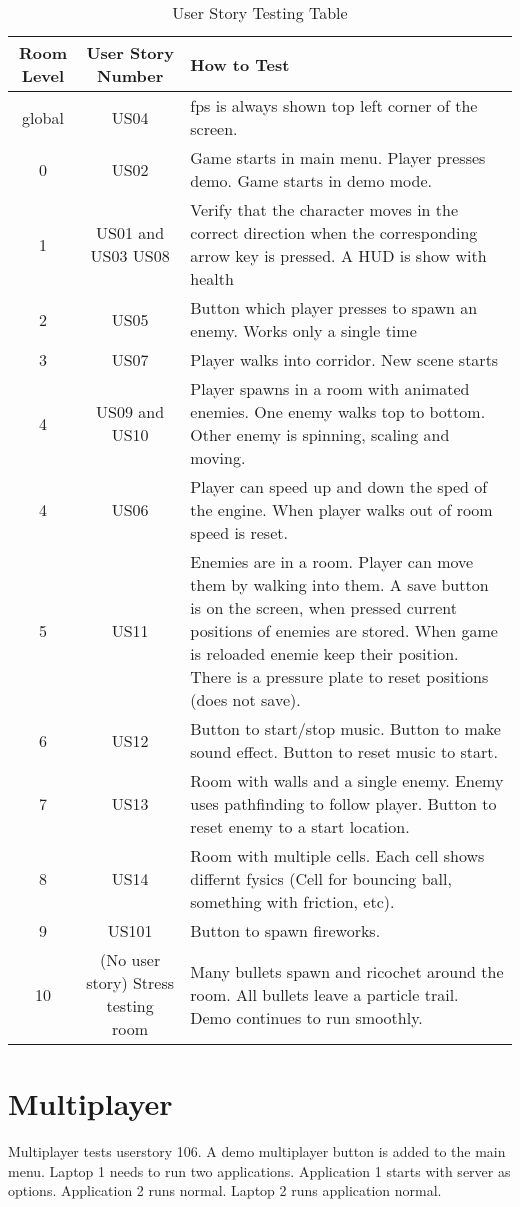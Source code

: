 \documentclass{article}
\begin{document}
\begin{table}[h!]
\centering
\begin{tabular}{|c|c|p{8cm}|}
\hline
\textbf{Room Level} & \textbf{User Story Number} & \textbf{How to Test} \\
\hline
global & US04 & fps is always shown top left corner of the screen. \\
\hline
0 & US02 & Game starts in main menu. Player presses demo. Game starts in demo mode. \\
\hline
1 & US01 and US03 US08 & Verify that the character moves in the correct direction when the corresponding arrow key is pressed. A HUD is show with health \\
\hline
2 & US05 & Button which player presses to spawn an enemy. Works only a single time \\
\hline
3 & US07 & Player walks into corridor. New scene starts \\
\hline
4 & US09 and US10 & Player spawns in a room with animated enemies. One enemy walks top to bottom. Other enemy is spinning, scaling and moving. \\
\hline
4 & US06 & Player can speed up and down the sped of the engine. When player walks out of room speed is reset. \\
\hline
5 & US11 & Enemies are in a room. Player can move them by walking into them. A save button is on the screen, when pressed current positions of enemies are stored. When game is reloaded enemie keep their position. There is a pressure plate to reset positions (does not save). \\
\hline
6 & US12 & Button to start/stop music. Button to make sound effect. Button to reset music to start. \\
\hline
7 & US13 & Room with walls and a single enemy. Enemy uses pathfinding to follow player. Button to reset enemy to a start location. \\
\hline
8 & US14 & Room with multiple cells. Each cell shows differnt fysics (Cell for bouncing ball, something with friction, etc). \\
\hline
9 & US101 & Button to spawn fireworks. \\
\hline
10 & (No user story) Stress testing room & Many bullets spawn and ricochet around the room. All bullets leave a particle trail. Demo continues to run smoothly. \\
\hline
\end{tabular}
\caption{User Story Testing Table}
\label{tab:user_story_testing}
\end{table}

\section{Multiplayer}
Multiplayer tests userstory 106. A demo multiplayer button is added to the main menu. Laptop 1 needs to run two applications. Application 1 starts with server as options. Application 2 runs normal. Laptop 2 runs application normal.
\end{document}
